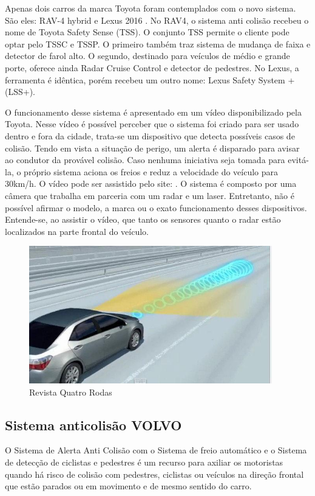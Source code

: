 Apenas dois carros da marca Toyota foram contemplados com o novo sistema. São eles: RAV-4 hybrid e Lexus 2016 \cite{3comper}. No RAV4, o sistema anti colisão recebeu o nome de Toyota Safety Sense (TSS). O conjunto TSS permite o cliente pode optar pelo TSSC e TSSP. O primeiro também traz sistema de mudança de faixa e detector de farol alto. O segundo, destinado para veículos de médio e grande porte, oferece ainda Radar Cruise Control e detector de pedestres. No Lexus, a ferramenta é idêntica, porém recebeu um outro nome: Lexus Safety System + (LSS+).

O funcionamento desse sistema é apresentado em um vídeo disponibilizado pela Toyota. Nesse vídeo é possível perceber que o sistema foi criado para ser usado dentro e fora da cidade, trata-se um dispositivo que detecta possíveis casos de colisão. Tendo em vista a situação de perigo, um alerta é disparado para avisar ao condutor da provável colisão. Caso nenhuma iniciativa seja tomada para evitá-la, o próprio sistema aciona os freios e reduz a velocidade do veículo para 30km/h. O vídeo pode ser assistido pelo site: \cite{4comper}. O sistema é composto por uma câmera que trabalha em parceria com um radar e um laser. Entretanto, não é possível afirmar o modelo, a marca ou o exato funcionamento desses dispositivos. Entende-se, ao assistir o vídeo, que tanto os sensores quanto o radar estão localizados na parte frontal do veículo.

\begin{figure}[h]
  \centering
  \includegraphics[width=400px, scale=1]{figuras/sinal_componentes}
  \caption{Revista Quatro Rodas}
\label{fig:sinal_componentes}
\end{figure}

\subsection{Sistema anticolisão VOLVO}

O Sistema de Alerta Anti Colisão com o Sistema de freio automático e o Sistema de detecção de ciclistas e pedestres é um recurso para axiliar os motoristas quando há risco de colisão com pedestres, ciclistas ou veículos na direção frontal que estão parados ou em movimento e de mesmo sentido do carro. 

